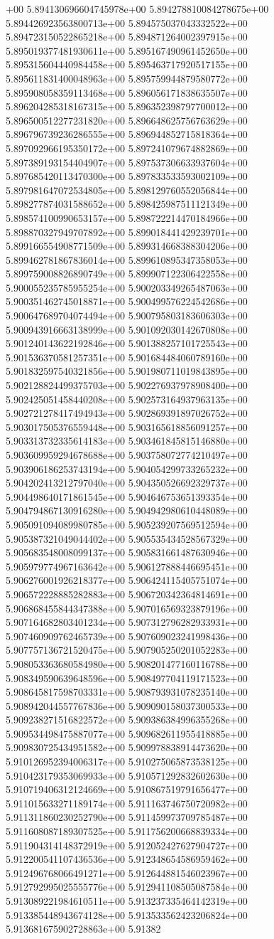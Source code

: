 +00	5.894130696604745978e+00	5.894278810084278675e+00	5.894426923563800713e+00	5.894575037043332522e+00	5.894723150522865218e+00	5.894871264002397915e+00	5.895019377481930611e+00	5.895167490961452650e+00	5.895315604440984458e+00	5.895463717920517155e+00	5.895611831400048963e+00	5.895759944879580772e+00	5.895908058359113468e+00	5.896056171838635507e+00	5.896204285318167315e+00	5.896352398797700012e+00	5.896500512277231820e+00	5.896648625756763629e+00	5.896796739236286555e+00	5.896944852715818364e+00	5.897092966195350172e+00	5.897241079674882869e+00	5.897389193154404907e+00	5.897537306633937604e+00	5.897685420113470300e+00	5.897833533593002109e+00	5.897981647072534805e+00	5.898129760552056844e+00	5.898277874031588652e+00	5.898425987511121349e+00	5.898574100990653157e+00	5.898722214470184966e+00	5.898870327949707892e+00	5.899018441429239701e+00	5.899166554908771509e+00	5.899314668388304206e+00	5.899462781867836014e+00	5.899610895347358053e+00	5.899759008826890749e+00	5.899907122306422558e+00	5.900055235785955254e+00	5.900203349265487063e+00	5.900351462745018871e+00	5.900499576224542686e+00	5.900647689704074494e+00	5.900795803183606303e+00	5.900943916663138999e+00	5.901092030142670808e+00	5.901240143622192846e+00	5.901388257101725543e+00	5.901536370581257351e+00	5.901684484060789160e+00	5.901832597540321856e+00	5.901980711019843895e+00	5.902128824499375703e+00	5.902276937978908400e+00	5.902425051458440208e+00	5.902573164937963135e+00	5.902721278417494943e+00	5.902869391897026752e+00	5.903017505376559448e+00	5.903165618856091257e+00	5.903313732335614183e+00	5.903461845815146880e+00	5.903609959294678688e+00	5.903758072774210497e+00	5.903906186253743194e+00	5.904054299733265232e+00	5.904202413212797040e+00	5.904350526692329737e+00	5.904498640171861545e+00	5.904646753651393354e+00	5.904794867130916280e+00	5.904942980610448089e+00	5.905091094089980785e+00	5.905239207569512594e+00	5.905387321049044402e+00	5.905535434528567329e+00	5.905683548008099137e+00	5.905831661487630946e+00	5.905979774967163642e+00	5.906127888446695451e+00	5.906276001926218377e+00	5.906424115405751074e+00	5.906572228885282883e+00	5.906720342364814691e+00	5.906868455844347388e+00	5.907016569323879196e+00	5.907164682803401234e+00	5.907312796282933931e+00	5.907460909762465739e+00	5.907609023241998436e+00	5.907757136721520475e+00	5.907905250201052283e+00	5.908053363680584980e+00	5.908201477160116788e+00	5.908349590639648596e+00	5.908497704119171523e+00	5.908645817598703331e+00	5.908793931078235140e+00	5.908942044557767836e+00	5.909090158037300533e+00	5.909238271516822572e+00	5.909386384996355268e+00	5.909534498475887077e+00	5.909682611955418885e+00	5.909830725434951582e+00	5.909978838914473620e+00	5.910126952394006317e+00	5.910275065873538125e+00	5.910423179353069933e+00	5.910571292832602630e+00	5.910719406312124669e+00	5.910867519791656477e+00	5.911015633271189174e+00	5.911163746750720982e+00	5.911311860230252790e+00	5.911459973709785487e+00	5.911608087189307525e+00	5.911756200668839334e+00	5.911904314148372919e+00	5.912052427627904727e+00	5.912200541107436536e+00	5.912348654586959462e+00	5.912496768066491271e+00	5.912644881546023967e+00	5.912792995025555776e+00	5.912941108505087584e+00	5.913089221984610511e+00	5.913237335464142319e+00	5.913385448943674128e+00	5.913533562423206824e+00	5.913681675902728863e+00	5.91382